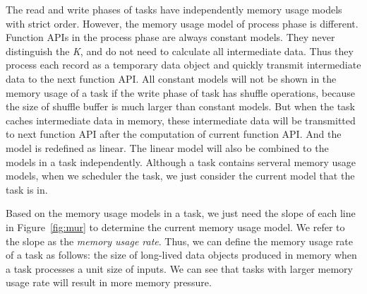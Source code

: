 The read and write phases of tasks have independently memory usage models with strict order. However, the memory usage model of process phase is different. Function APIs in the process phase are always constant models. They never distinguish the \textit{K}, and do not need to calculate all intermediate data. Thus they process each record as a temporary data object and quickly transmit intermediate data to the next function API. All constant models will not be shown in the memory usage of a task if the write phase of task has shuffle operations, because the size of shuffle buffer is much larger than constant models. But when the task caches intermediate data in memory, these intermediate data will be transmitted to next function API after the computation of current function API. And the model is redefined as linear. The linear model will also be combined to the models in a task independently. Although a task contains serveral memory usage models, when we scheduler the task, we just consider the current model that the task is in.

Based on the memory usage models in a task, we just need the slope of each line in Figure~\ref{fig:mur} to determine the current memory usage model. We refer to the slope as the \textit{memory usage rate}. Thus, we can define the memory usage rate of a task as follows: the size of long-lived data objects produced in memory when a task processes a unit size of inputs. We can see that tasks with larger memory usage rate will result in more memory pressure.



